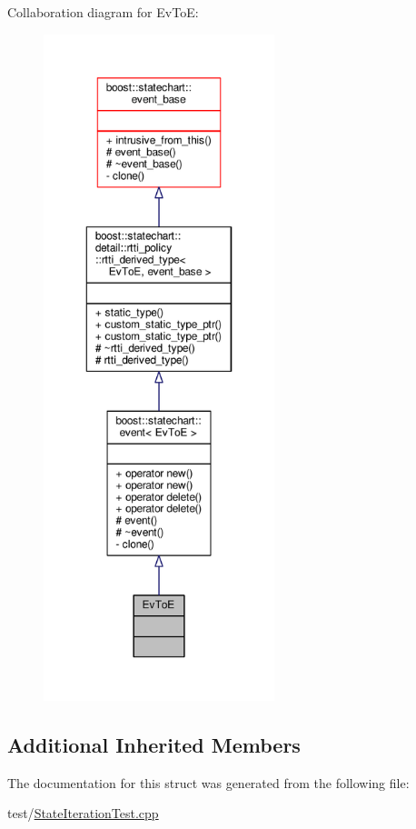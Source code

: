 Collaboration diagram for Ev\+ToE\+:
\nopagebreak
\begin{figure}[H]
\begin{center}
\leavevmode
\includegraphics[height=550pt]{struct_ev_to_e__coll__graph}
\end{center}
\end{figure}
\subsection*{Additional Inherited Members}


The documentation for this struct was generated from the following file\+:\begin{DoxyCompactItemize}
\item 
test/\mbox{\hyperlink{_state_iteration_test_8cpp}{State\+Iteration\+Test.\+cpp}}\end{DoxyCompactItemize}
